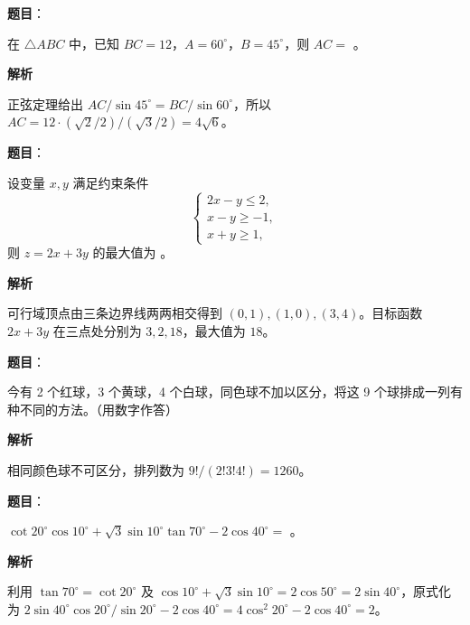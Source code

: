 \begin{answer}

\textbf{题目}：

在 $\triangle ABC$ 中，已知 $BC=12$，$A=60^\circ$，$B=45^\circ$，则 $AC=$ \gkblank{}。

\textbf{解析}

正弦定理给出 $AC/\sin45^\circ=BC/\sin60^\circ$，所以 $AC=12\cdot(\sqrt2/2)/(\sqrt3/2)=4\sqrt6$。


\end{answer}
\begin{answer}

\textbf{题目}：

设变量 $x,y$ 满足约束条件
\nopagebreak[4]
\[\begin{cases}2x-y\leqslant2,\\x-y\geqslant-1,\\x+y\geqslant1,\end{cases}\]
则 $z=2x+3y$ 的最大值为 \gkblank{}。

\textbf{解析}

可行域顶点由三条边界线两两相交得到 $(0,1),(1,0),(3,4)$。目标函数 $2x+3y$ 在三点处分别为 $3,2,18$，最大值为 $18$。


\end{answer}
\begin{answer}

\textbf{题目}：

今有 2 个红球，3 个黄球，4 个白球，同色球不加以区分，将这 9 个球排成一列有 \gkblank{} 种不同的方法。（用数字作答）

\textbf{解析}

相同颜色球不可区分，排列数为 $9!/(2!3!4!)=1260$。


\end{answer}
\begin{answer}

\textbf{题目}：

$\cot20^\circ\cos10^\circ+\sqrt3\sin10^\circ\tan70^\circ-2\cos40^\circ=$ \gkblank{}。

\textbf{解析}

利用 $\tan70^\circ=\cot20^\circ$ 及 $\cos10^\circ+\sqrt3\sin10^\circ=2\cos50^\circ=2\sin40^\circ$，原式化为 $2\sin40^\circ\cos20^\circ/\sin20^\circ-2\cos40^\circ=4\cos^2 20^\circ-2\cos40^\circ=2$。


\end{answer}
